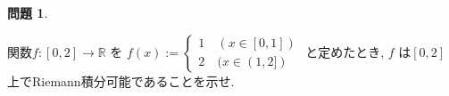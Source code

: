 \documentclass{jsarticle}
\newtheorem*{question*}{問題}
\begin{document}
\begin{question*}
\end{question*}
関数$f:[0,2] \to \mathbb{R}$ を $f(x) := \begin{cases}
  1 & \ (x \in [0,1]) \\ 2 & \ (x \in (1,2]) \end{cases}$ 
  と定めたとき, $f$ は$[0,2]$ 上でRiemann積分可能であることを示せ.
\end{document}
